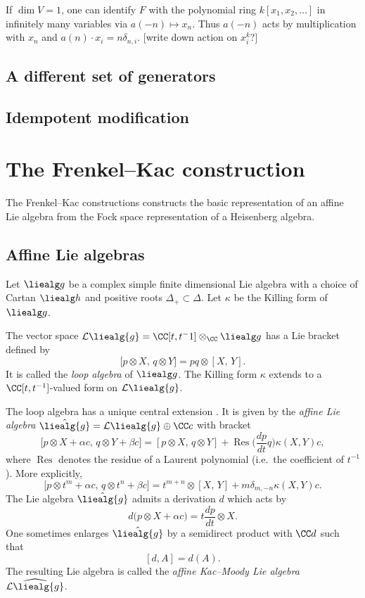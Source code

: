 \documentclass{ck-article}
\newcommand\loopliealg[1]{\mathcal{L}\liealg{#1}}
\newcommand\affliealg[1]{\hat{\liealg{#1}}}
\newcommand\affKMliealg[1]{\widehat{\loopliealg{#1}}}
\DeclareMathOperator\Res{Res}
\begin{document}
\begin{Example}
    If $\dim V = 1$, one can identify $F$ with the polynomial ring $k[x_1,x_2,\dots]$ in infinitely many variables via $a(-n) \mapsto x_n$.
    Thus $a(-n)$ acts by multiplication with $x_n$ and $a(n) \cdot x_i = n\delta_{n,i}$. [write down action on $x_i^k$?]
\end{Example}


\subsection{A different set of generators}

\subsection{Idempotent modification}

\section{The Frenkel--Kac construction}

The Frenkel--Kac constructions constructs the basic representation of an affine Lie algebra from the Fock space representation of a Heisenberg algebra.

\subsection{Affine Lie algebras}

Let $\liealg g$ be a complex simple finite dimensional Lie algebra with a choice of Cartan $\liealg h$ and positive roots $\Delta_+ \subset \Delta$.
Let $\kappa$ be the Killing form of $\liealg g$.

The vector space $\loopliealg g = \CC[t, t^-1] \otimes_\CC \liealg g$ has a Lie bracket defined by 
\[
    \bigl[ p \otimes X,\, q \otimes Y\bigr] = pq \otimes [X,\,Y].
\]
It is called the \emph{loop algebra} of $\liealg g$.
The Killing form $\kappa$ extends to a $\CC[t,t^{-1}]$-valued form on $\loopliealg g$.

The loop algebra has a unique central extension \cite[Theorem~10.2]{Gordon:2009:InfiniteDimensionalLieAlgebras}.
It is given by the \emph{affine Lie algebra} $\affliealg g = \loopliealg g \oplus \CC c$ with bracket
\[
    \bigl[p \otimes X + \alpha c,\, q \otimes Y + \beta c\bigr]  =
    [p\otimes X,\, q \otimes Y] + \Res\biggl(\frac{dp}{dt}q\biggr)\kappa(X,Y)c,
\]
where $\Res$ denotes the residue of a Laurent polynomial (i.e.~the coefficient of $t^{-1}$).
More explicitly,
\[
    \bigl[p \otimes t^m + \alpha c,\, q \otimes t^n + \beta c\bigr]  =
    t^{m+n} \otimes [X,\, Y] + m\delta_{m,-n}\kappa(X,Y)c.
\]
The Lie algebra $\affliealg g$ admits a derivation $d$ which acts by
\[
    d\bigl(p \otimes X + \alpha c) = t\frac{dp}{dt} \otimes X.
\]
One sometimes enlarges $\affliealg g$ by a semidirect product with $\CC d$ such that
\[
    [d, A] = d(A).
\]
The resulting Lie algebra is called the \emph{affine Kac--Moody Lie algebra} $\affKMliealg g$.
\end{document}
